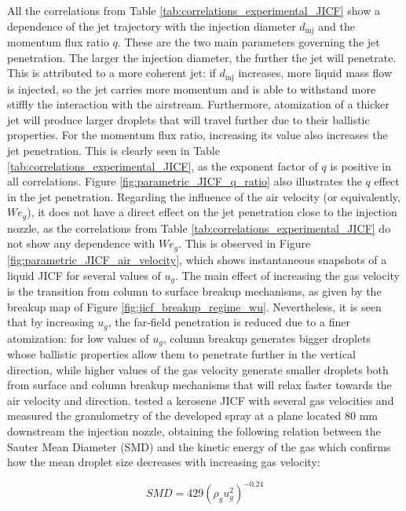 All the correlations from Table \ref{tab:correlations_experimental_JICF} show a dependence of the jet trajectory with the injection diameter $d_\mathrm{inj}$ and the momentum flux ratio $q$. These are the two main parameters governing the jet penetration. The larger the injection diameter, the further the jet will penetrate. This is attributed to a more coherent jet: if $d_\mathrm{inj}$ increases, more liquid mass flow is injected, so the jet carries more momentum and is able to withstand more stiffly the
interaction with the airstream. Furthermore, atomization of a thicker jet will produce larger droplets that
will travel further due to their ballistic properties. For the momentum flux ratio, increasing its value also increases the jet penetration. This is clearly seen in Table \ref{tab:correlations_experimental_JICF}, as the exponent factor of $q$ is positive in all correlations. Figure \ref{fig:parametric_JICF_q_ratio} also illustrates the $q$ effect in the jet penetration. Regarding the influence of the air velocity (or equivalently, $We_g$), it does not have a direct effect on the jet penetration close to the injection nozzle, as the correlations from Table \ref{tab:correlations_experimental_JICF} do not show any dependence with $We_g$. This is observed in Figure \ref{fig:parametric_JICF_air_velocity}, which shows instantaneous snapshots of a liquid JICF for several values of $u_g$. The main effect of increasing the gas velocity is the transition from column to surface breakup mechanisms, as given by the breakup map of Figure \ref{fig:jicf_breakup_regime_wu}. Nevertheless, it is seen that by increasing $u_g$, the far-field penetration is reduced due to a finer atomization: for low values of $u_g$, column breakup generates bigger droplets whose ballistic properties allow them to penetrate further in the vertical direction, while higher values of the gas velocity generate smaller droplets both from surface and column breakup mechanisms that will relax faster towards the air velocity and direction.  tested a kerosene JICF with several gas velocities and measured the granulometry of the developed spray at a plane located 80 mm downstream the injection nozzle, obtaining the following relation between the Sauter Mean Diameter (SMD) and the kinetic energy of the gas which confirms how the mean droplet size decreases with increasing gas velocity:

\begin{equation}
SMD = 429 \left( \rho_g u_g^2 \right)^{-0.24}
\end{equation}

